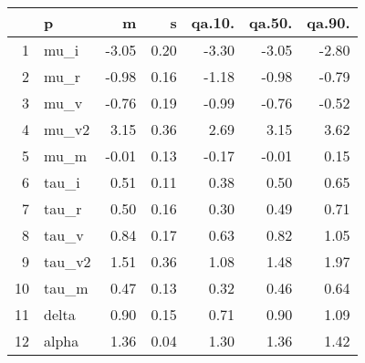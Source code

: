 \begin{table}[ht]
\centering
\begin{tabular}{rlrrrrr}
  \hline
 & p & m & s & qa.10. & qa.50. & qa.90. \\ 
  \hline
1 & mu\_i & -3.05 & 0.20 & -3.30 & -3.05 & -2.80 \\ 
  2 & mu\_r & -0.98 & 0.16 & -1.18 & -0.98 & -0.79 \\ 
  3 & mu\_v & -0.76 & 0.19 & -0.99 & -0.76 & -0.52 \\ 
  4 & mu\_v2 & 3.15 & 0.36 & 2.69 & 3.15 & 3.62 \\ 
  5 & mu\_m & -0.01 & 0.13 & -0.17 & -0.01 & 0.15 \\ 
  6 & tau\_i & 0.51 & 0.11 & 0.38 & 0.50 & 0.65 \\ 
  7 & tau\_r & 0.50 & 0.16 & 0.30 & 0.49 & 0.71 \\ 
  8 & tau\_v & 0.84 & 0.17 & 0.63 & 0.82 & 1.05 \\ 
  9 & tau\_v2 & 1.51 & 0.36 & 1.08 & 1.48 & 1.97 \\ 
  10 & tau\_m & 0.47 & 0.13 & 0.32 & 0.46 & 0.64 \\ 
  11 & delta & 0.90 & 0.15 & 0.71 & 0.90 & 1.09 \\ 
  12 & alpha & 1.36 & 0.04 & 1.30 & 1.36 & 1.42 \\ 
   \hline
\end{tabular}
\label{tab:param}
\end{table}
